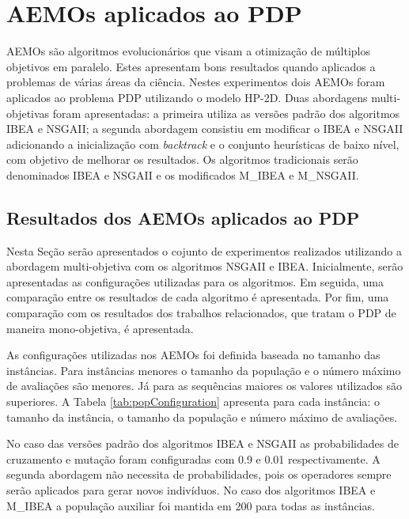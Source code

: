 \section{AEMOs aplicados ao PDP}

AEMOs são algoritmos evolucionários que visam a otimização de múltiplos objetivos em paralelo. Estes apresentam bons resultados quando aplicados a problemas de várias áreas da ciência.  Nestes experimentos dois AEMOs foram aplicados ao problema PDP utilizando o modelo HP-2D. Duas abordagens multi-objetivas foram apresentadas: a primeira utiliza as versões padrão dos algoritmos IBEA e NSGAII; a segunda abordagem consistiu em modificar o IBEA e NSGAII adicionando a inicialização com \textit{backtrack} e o conjunto heurísticas de baixo nível, com objetivo de melhorar os resultados. Os algoritmos tradicionais serão denominados IBEA e NSGAII e os modificados M\_IBEA e M\_NSGAII.




\subsection{Resultados dos AEMOs aplicados ao PDP}

Nesta Seção serão apresentados o cojunto de experimentos realizados utilizando a abordagem multi-objetiva com os algoritmos NSGAII e IBEA. Inicialmente, serão apresentadas as configurações utilizadas para os algoritmos. Em seguida, uma comparação entre os resultados de cada algoritmo é apresentada. Por fim, uma comparação com os resultados dos trabalhos relacionados, que tratam o PDP de maneira mono-objetiva, é apresentada.

As configurações utilizadas nos AEMOs foi definida baseada no tamanho das instâncias. Para instâncias menores o tamanho da população e o número máximo de avaliações são menores. Já para as sequências maiores os valores utilizados são superiores. A Tabela \ref{tab:popConfiguration} apresenta para cada instância: o tamanho da instância, o tamanho da população e número máximo de avaliações.

No caso das versões padrão dos algoritmos IBEA e NSGAII as probabilidades de cruzamento e mutação foram configuradas com 0.9 e 0.01 respectivamente. A segunda abordagem não necessita de probabilidades, pois os operadores sempre serão aplicados para gerar novos indivíduos. No caso dos algoritmos IBEA e M\_IBEA a população auxiliar foi mantida em 200 para todas as instâncias.

